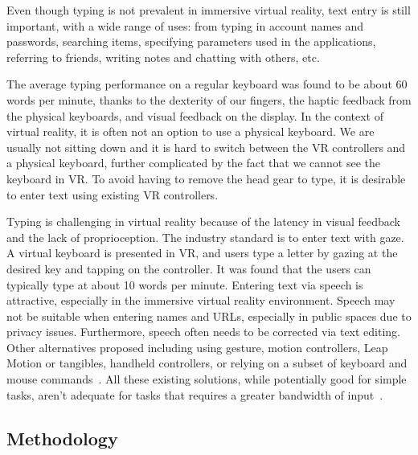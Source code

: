 Even though typing is not prevalent in immersive virtual reality, text entry is still important, with a wide range of uses: from typing in account names and passwords, searching items, specifying parameters used in the applications, referring to friends,  writing notes and chatting with others, etc.      

The average typing performance on a regular keyboard was found to be about 60 words per minute\cite{varcholik:textentry}, thanks to the dexterity of our fingers, the haptic feedback from the physical keyboards, and visual feedback on the display.    In the context of virtual reality, it is often not an option to use a physical keyboard.  We are usually not sitting down and it is hard to switch between the VR controllers and a physical keyboard, further complicated by the fact that we cannot see the keyboard in VR.  To avoid having to remove the head gear to type, it is desirable to enter text using existing VR controllers. 

Typing is challenging in virtual reality because of the latency in visual feedback and the lack of proprioception.  The industry standard is to enter text with gaze.  A virtual keyboard is presented in VR, and users type a letter by gazing at the desired key and tapping on the controller.   It was found that the users can typically type at about 10 words per minute.   Entering text via speech is attractive, especially in the immersive virtual reality environment.  Speech may not be suitable when entering names and URLs, especially in public spaces due to privacy issues.  Furthermore, speech often needs to be corrected via text editing.  Other alternatives proposed including using gesture, motion controllers, Leap Motion or tangibles, handheld controllers, or relying on a subset of keyboard and mouse commands~\cite{billinghurst1999collaborative}.
All these existing solutions, while potentially good for simple tasks, aren't adequate for tasks that requires a greater bandwidth of input~\cite{McGill:2015:DRO:2702123.2702382}.


\subsection{Methodology}

